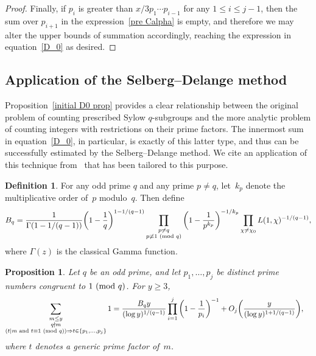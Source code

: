 \documentclass[12pt,reqno]{amsart}
\newtheorem{proposition}[theorem]{Proposition}
\theoremstyle{definition}
\newtheorem{definition}[theorem]{Definition}
\renewcommand{\mod}[1]{{\ifmmode\text{\rm\ (mod~$#1$)}\else\discretionary{}{}{\hbox{ }}\rm(mod~$#1$)\fi}}
\begin{document}
\begin{proof}
Finally, if $p_i$ is greater than $x/3p_1\cdots p_{i-1}$ for any $1\le i\le j-1$, then the sum over $p_{i+1}$ in the expression~\eqref{pre Calpha} is empty, and therefore we may alter the upper bounds of summation accordingly, reaching the expression in equation~\eqref{D_0} as desired.
\end{proof}


\subsection{Application of the Selberg--Delange method}

Proposition~\ref{initial D0 prop} provides a clear relationship between the original problem of counting prescribed Sylow $q$-subgroups and the more analytic problem of counting integers with restrictions on their prime factors. The innermost sum in equation~\eqref{D_0}, in particular, is exactly of this latter type, and thus can be successfully estimated by the Selberg--Delange method. We cite an application of this technique from~\cite{CM} that has been tailored to this purpose.

\begin{definition} \label{Bq def}
For any odd prime $q$ and any prime $p\ne q$, let~$k_p$ denote the multiplicative order of~$p$ modulo~$q$. Then define
\[
B_q=\frac{1}{\Gamma(1-1/(q-1))}\bigg(1-\frac1q \bigg)^{1-1/(q-1)}\prod_{\substack{p\ne q\\ p\not\equiv 1 \mod q}} \bigg(1-\frac1{p^{k_p}} \bigg)^{-1/k_p}\prod_{\chi\ne \chi_0}L(1,\chi)^{-1/(q-1)},
\]
where $\Gamma(z)$ is the classical Gamma function.
\end{definition}

\begin{proposition} \label{sdsum2}
Let $q$ be an odd prime, and let $p_1,\ldots,p_j$ be distinct prime numbers congruent to $1\mod q$. For $y\ge3$,
\begin{align*}
\sum_{\substack{m\le y\\ q\nmid m\\ (t\mid m \text{ and }t\equiv 1\mod q)\Rightarrow t\in\{p_1,\ldots,p_j\} }}1 &=\frac{B_q y}{(\log y)^{1/(q-1)}}\prod_{i=1}^j\bigg(1-\frac 1{p_i}\bigg)^{-1} + O_j\bigg( \frac y{(\log y)^{1+1/(q-1)}} \bigg),
\end{align*}
where $t$ denotes a generic prime factor of~$m$.
\end{proposition}
\end{document}
